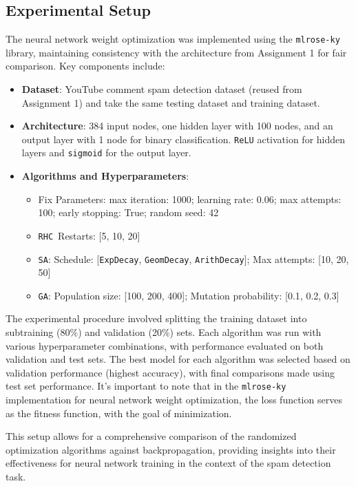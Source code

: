 \documentclass[conference]{IEEEtran}
\newcommand{\sa}{\texttt{SA}}
\newcommand{\ga}{\texttt{GA}}
\newcommand{\rhc}{\texttt{RHC}}
\newcommand{\expD}{\texttt{ExpDecay}}
\newcommand{\arithD}{\texttt{ArithDecay}}
\newcommand{\geomD}{\texttt{GeomDecay}}
\begin{document}
\subsection{Experimental Setup \label{sec:neural-network-experimental-setup}}
The neural network weight optimization was implemented using the \texttt{mlrose-ky} library, maintaining consistency with the architecture from Assignment 1 for fair comparison. Key components include:
\begin{itemize}
    \item \textbf{Dataset}: YouTube comment spam detection dataset (reused from Assignment 1) and take the same testing dataset and training dataset.
    \item \textbf{Architecture}: 384 input nodes, one hidden layer with 100 nodes, and an output layer with 1 node for binary classification. \texttt{ReLU} activation for hidden layers and \texttt{sigmoid} for the output layer.
    \item \textbf{Algorithms and Hyperparameters}:
    \begin{itemize}
        \item Fix Parameters: max iteration: 1000; learning rate: 0.06; max attempts: 100; early stopping: True; random seed: 42
        \item \rhc\ Restarts: [5, 10, 20]
        \item \sa: Schedule: [\expD, \geomD, \arithD];  Max attempts: [10, 20, 50]
        \item \ga: Population size: [100, 200, 400]; Mutation probability: [0.1, 0.2, 0.3]
    \end{itemize}
\end{itemize}
The experimental procedure involved splitting the training dataset into subtraining (80\%) and validation (20\%) sets. Each algorithm was run with various hyperparameter combinations, with performance evaluated on both validation and test sets. The best model for each algorithm was selected based on validation performance (highest accuracy), with final comparisons made using test set performance.
It's important to note that in the  \texttt{mlrose-ky} implementation for neural network weight optimization, the loss function serves as the fitness function, with the goal of minimization. 

This setup allows for a comprehensive comparison of the randomized optimization algorithms against backpropagation, providing insights into their effectiveness for neural network training in the context of the spam detection task.
\end{document}
